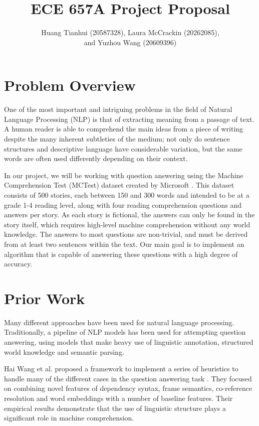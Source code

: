 \documentclass[]{scrartcl}
\title{ECE 657A Project Proposal}
\author{Huang Tianhui (20587328), Laura McCrackin (20262085), \\
and Yuzhou Wang (20609396)}
\begin{document}
\maketitle

\section{Problem Overview}

One of the most important and intriguing problems in the field of Natural Language Processing (NLP) is that of extracting meaning from a passage of text.  A human reader is able to comprehend the main ideas from a piece of writing despite the many inherent subtleties of the medium; not only do sentence structures and descriptive language have considerable variation, but the same words are often used differently depending on their context.  

In our project, we will be working with question answering using the Machine Comprehension Test (MCTest) dataset created by Microsoft \cite{richardson2013mctest}.  This dataset consists of 500 stories, each between 150 and 300 words and intended to be at a grade 1-4 reading level, along with four reading comprehension questions and answers per story.  As each story is fictional, the answers can only be found in the story itself, which requires high-level machine comprehension without any world knowledge. The answers to most questions are non-trivial, and must be derived from at least two sentences within the text. Our main goal is to implement an algorithm that is capable of answering these questions with a high degree of accuracy.

\section{Prior Work}
Many different approaches have been used for natural language processing. Traditionally, a pipeline of NLP models has been used for attempting question answering, using models that make heavy use of linguistic annotation, structured world knowledge and semantic parsing. 

Hai Wang et al. proposed a framework to implement a series of heuristics to handle many of the different cases in the question answering task \cite{wang2015machine}.  They focused on combining novel features of dependency syntax, frame semantics, co-reference resolution and word embeddings with a number of baseline features. Their empirical results demonstrate that the use of linguistic structure plays a significant role in machine comprehension. 
\end{document}
